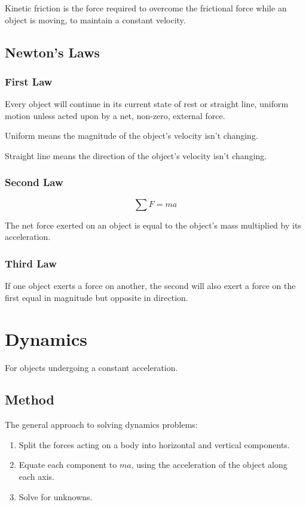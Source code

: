 \documentclass[a4paper,11pt]{report}
\begin{document}
Kinetic friction is the force required to overcome the frictional force while
an object is moving, to maintain a constant velocity.

\subsection{Newton's Laws}

\subsubsection{First Law}

Every object will continue in its current state of rest or straight line,
uniform motion unless acted upon by a net, non-zero, external force.

Uniform means the magnitude of the object's velocity isn't changing.

Straight line means the direction of the object's velocity isn't changing.

\subsubsection{Second Law}

$$
\sum F = ma
$$

The net force exerted on an object is equal to the object's mass multiplied by
its acceleration.

\subsubsection{Third Law}

If one object exerts a force on another, the second will also exert a force on
the first equal in magnitude but opposite in direction.


\section{Dynamics}

For objects undergoing a constant acceleration.

\subsection{Method}

The general approach to solving dynamics problems:

\begin{enumerate}
\item Split the forces acting on a body into horizontal and vertical components.
\item Equate each component to $ma$, using the acceleration of the object along
	each axis.
\item Solve for unknowns.
\end{enumerate}
\end{document}
